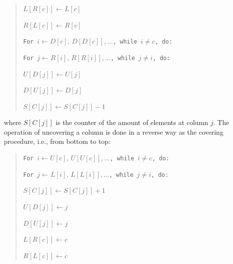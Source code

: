 \documentclass[12pt]{article}
\begin{document}
{\small
  \begin{quote}
    \texttt{$L{\left[ R{\left[ c \right]} \right]} \leftarrow L{\left[ c \right]}$}
    
    \texttt{$R{\left[ L{\left[ c \right]} \right]} \leftarrow R{\left[ c \right]}$}

    \texttt{For $i \leftarrow D{\left[ c \right]} , \, D{\left[ D{\left[ c \right]} \right]} , \dots$, while $i \neq c$, do:}

       \hspace{0.5cm}\texttt{For $j \leftarrow R{\left[ i \right]}, \, R{\left[ R{\left[ i \right]} \right]} , \dots$, while $j \neq i$, do:}

          \hspace{1cm}\texttt{$U{\left[ D{\left[ j \right]} \right]} \leftarrow U{\left[ j \right]}$}

          \hspace{1cm}\texttt{$D{\left[ U{\left[ j \right]} \right]} \leftarrow D{\left[ j \right]}$}

          \hspace{1cm}\texttt{$S{\left[ C{\left[ j \right]} \right]} \leftarrow S{\left[ C{\left[ j \right]} \right]} - 1$}
  \end{quote}
}

\linespread{1.5}

\noindent where $S{\left[ C{\left[ j \right]} \right]}$ is the counter of the amount of elements at column $j$.
The operation of uncovering a column is done in a reverse way as the covering procedure, i.e., from bottom to top:

\linespread{0.8}

{\small
  \begin{quote}
    \texttt{For $i \leftarrow U{\left[ c \right]} , \, U{\left[ U{\left[ c \right]} \right]} , \dots$, while $i \neq c$, do:}

       \hspace{0.5cm}\texttt{For $j \leftarrow L{\left[ i \right]}, \, L{\left[ L{\left[ i \right]} \right]} , \dots$, while $j \neq i$, do:}

          \hspace{1cm}\texttt{$S{\left[ C{\left[ j \right]} \right]} \leftarrow S{\left[ C{\left[ j \right]} \right]} + 1$}

          \hspace{1cm}\texttt{$U{\left[ D{\left[ j \right]} \right]} \leftarrow j$}

          \hspace{1cm}\texttt{$D{\left[ U{\left[ j \right]} \right]} \leftarrow j$}

    \texttt{$L{\left[ R{\left[ c \right]} \right]} \leftarrow c$}
    
    \texttt{$R{\left[ L{\left[ c \right]} \right]} \leftarrow c$}
  \end{quote}
}
\end{document}
